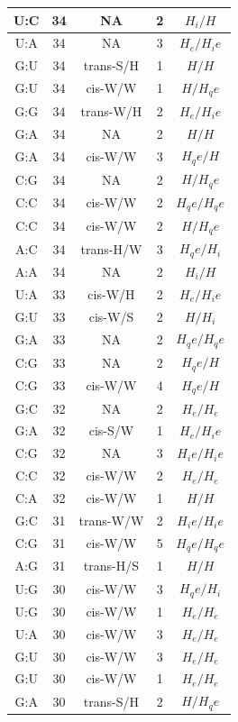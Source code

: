 \begin{center}
\begin{longtable}{c|c|c|c|c}
U:C & 34 & NA & 2 & $H_i/H$ \\  \hline
U:A & 34 & NA & 3 & $H_e/H_ie$ \\  \hline
G:U & 34 & trans-S/H & 1 & $H/H$ \\  \hline
G:U & 34 & cis-W/W & 1 & $H/H_qe$ \\  \hline
G:G & 34 & trans-W/H & 2 & $H_e/H_ie$ \\  \hline
G:A & 34 & NA & 2 & $H/H$ \\  \hline
G:A & 34 & cis-W/W & 3 & $H_qe/H$ \\  \hline
C:G & 34 & NA & 2 & $H/H_qe$ \\  \hline
C:C & 34 & cis-W/W & 2 & $H_qe/H_qe$ \\  \hline
C:C & 34 & cis-W/W & 2 & $H/H_qe$ \\  \hline
A:C & 34 & trans-H/W & 3 & $H_qe/H_i$ \\  \hline
A:A & 34 & NA & 2 & $H_i/H$ \\  \hline
U:A & 33 & cis-W/H & 2 & $H_e/H_ie$ \\  \hline
G:U & 33 & cis-W/S & 2 & $H/H_i$ \\  \hline
G:A & 33 & NA & 2 & $H_qe/H_qe$ \\  \hline
C:G & 33 & NA & 2 & $H_qe/H$ \\  \hline
C:G & 33 & cis-W/W & 4 & $H_qe/H$ \\  \hline
G:C & 32 & NA & 2 & $H_e/H_e$ \\  \hline
G:A & 32 & cis-S/W & 1 & $H_e/H_ie$ \\  \hline
C:G & 32 & NA & 3 & $H_ie/H_ie$ \\  \hline
C:C & 32 & cis-W/W & 2 & $H_e/H_e$ \\  \hline
C:A & 32 & cis-W/W & 1 & $H/H$ \\  \hline
G:C & 31 & trans-W/W & 2 & $H_ie/H_ie$ \\  \hline
C:G & 31 & cis-W/W & 5 & $H_qe/H_qe$ \\  \hline
A:G & 31 & trans-H/S & 1 & $H/H$ \\  \hline
U:G & 30 & cis-W/W & 3 & $H_qe/H_i$ \\  \hline
U:G & 30 & cis-W/W & 1 & $H_e/H_e$ \\  \hline
U:A & 30 & cis-W/W & 3 & $H_e/H_e$ \\  \hline
G:U & 30 & cis-W/W & 3 & $H_e/H_e$ \\  \hline
G:U & 30 & cis-W/W & 1 & $H_e/H_e$ \\  \hline
G:A & 30 & trans-S/H & 2 & $H/H_qe$ \\  \hline

\end{longtable}
\end{center}
